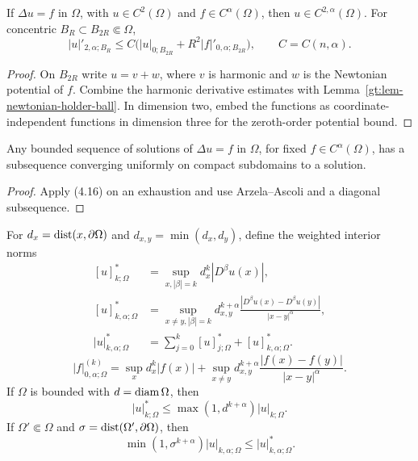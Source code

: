 \begin{theorem}\label{gt:thm-poisson-interior-holder}
If $\Delta u=f$ in $\Omega$, with $u\in C^2(\Omega)$ and
$f\in C^\alpha(\Omega)$, then $u\in C^{2,\alpha}(\Omega)$. For concentric
$B_R\subset B_{2R}\Subset\Omega$,
\begin{equation}
\tag{4.16}
|u|'_{2,\alpha;B_R}
\leq C\bigl(|u|_{0;B_{2R}}+R^2|f|'_{0,\alpha;B_{2R}}\bigr),
\qquad C=C(n,\alpha).
\end{equation}
\end{theorem}
\begin{proof}
\sketch On $B_{2R}$ write $u=v+w$, where $v$ is harmonic and $w$ is the
Newtonian potential of $f$. Combine the harmonic derivative estimates with
Lemma~\ref{gt:lem-newtonian-holder-ball}. In dimension two, embed the
functions as coordinate-independent functions in dimension three for the
zeroth-order potential bound.
\end{proof}

\begin{corollary}\label{gt:cor-poisson-compactness}
Any bounded sequence of solutions of $\Delta u=f$ in $\Omega$, for fixed
$f\in C^\alpha(\Omega)$, has a subsequence converging uniformly on compact
subdomains to a solution.
\end{corollary}
\begin{proof}
\sketch Apply (4.16) on an exhaustion and use Arzela--Ascoli and a diagonal
subsequence.
\end{proof}

For $d_x=\operatorname{dist}(x,\partial\Omega)$ and
$d_{x,y}=\min(d_x,d_y)$, define the weighted interior norms
\begin{equation}
\tag{4.17}
\begin{aligned}
[u]^*_{k;\Omega}&=\sup_{x,|\beta|=k}d_x^k|D^\beta u(x)|,\\
[u]^*_{k,\alpha;\Omega}
&=\sup_{x\neq y,|\beta|=k}
d_{x,y}^{k+\alpha}
\frac{|D^\beta u(x)-D^\beta u(y)|}{|x-y|^\alpha},\\
|u|^*_{k,\alpha;\Omega}&=\sum_{j=0}^k[u]^*_{j;\Omega}
+[u]^*_{k,\alpha;\Omega}.
\end{aligned}
\end{equation}
\begin{equation}
\tag{4.18}
|f|^{(k)}_{0,\alpha;\Omega}
=\sup_x d_x^k|f(x)|+\sup_{x\neq y}d_{x,y}^{k+\alpha}
\frac{|f(x)-f(y)|}{|x-y|^\alpha}.
\end{equation}
If $\Omega$ is bounded with $d=\operatorname{diam}\Omega$, then
\begin{equation}
\tag{4.17'}
|u|^*_{k;\Omega}\leq\max(1,d^{k+\alpha})|u|_{k;\Omega}.
\end{equation}
If $\Omega'\Subset\Omega$ and $\sigma=\operatorname{dist}(\Omega',\partial\Omega)$, then
\begin{equation}
\tag{4.17''}
\min(1,\sigma^{k+\alpha})|u|_{k,\alpha;\Omega}
\leq|u|^*_{k,\alpha;\Omega}.
\end{equation}

